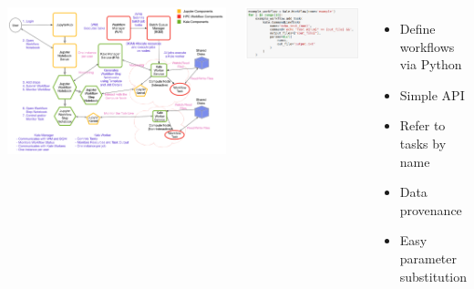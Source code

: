 \documentclass{tikzposter}
\begin{document}
\begin{columns}
  {
     \includegraphics[width=\linewidth]{Kale_HPC}
 }
 

 {
    \begin{minipage}{.6\linewidth}
        \includegraphics[width=\linewidth]{../img/screenshot/define} \\
    \end{minipage}
    \begin{minipage}{.39\linewidth}
        \begin{itemize}
            \item Define workflows via Python
            \item Simple API
            \item Refer to tasks by name
            \item Data provenance
            \item Easy parameter substitution
        \end{itemize}
    \end{minipage}

    \vspace{-1.5em}
}


\end{columns}
\end{document}
